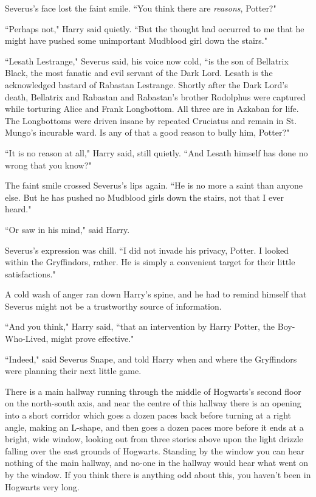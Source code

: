 Severus's face lost the faint smile. ``You think there are \emph{reasons}, Potter?"

``Perhaps not," Harry said quietly. ``But the thought had occurred to me that he might have pushed some unimportant Mudblood girl down the stairs."

``Lesath Lestrange," Severus said, his voice now cold, ``is the son of Bellatrix Black, the most fanatic and evil servant of the Dark Lord. Lesath is the acknowledged bastard of Rabastan Lestrange. Shortly after the Dark Lord's death, Bellatrix and Rabastan and Rabastan's brother Rodolphus were captured while torturing Alice and Frank Longbottom. All three are in Azkaban for life. The Longbottoms were driven insane by repeated Cruciatus and remain in St. Mungo's incurable ward. Is any of that a good reason to bully him, Potter?"

``It is no reason at all," Harry said, still quietly. ``And Lesath himself has done no wrong that you know?"

The faint smile crossed Severus's lips again. ``He is no more a saint than anyone else. But he has pushed no Mudblood girls down the stairs, not that I ever heard."

``Or saw in his mind," said Harry.

Severus's expression was chill. ``I did not invade his privacy, Potter. I looked within the Gryffindors, rather. He is simply a convenient target for their little satisfactions."

A cold wash of anger ran down Harry's spine, and he had to remind himself that Severus might not be a trustworthy source of information.

``And you think," Harry said, ``that an intervention by Harry Potter, the Boy-Who-Lived, might prove effective."

``Indeed," said Severus Snape, and told Harry when and where the Gryffindors were planning their next little game.

\later

There is a main hallway running through the middle of Hogwarts's second floor on the north-south axis, and near the centre of this hallway there is an opening into a short corridor which goes a dozen paces back before turning at a right angle, making an L-shape, and then goes a dozen paces more before it ends at a bright, wide window, looking out from three stories above upon the light drizzle falling over the east grounds of Hogwarts. Standing by the window you can hear nothing of the main hallway, and no-one in the hallway would hear what went on by the window. If you think there is anything odd about this, you haven't been in Hogwarts very long.

